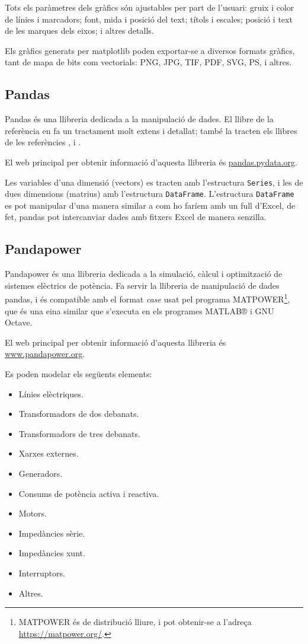Tots els paràmetres dels gràfics són ajustables per part de l'usuari: gruix i color de línies i marcadors; font, mida i posició  del text;  títols i escales; posició i text de les marques dels eixos; i altres detalls.

Els gràfics generats per matplotlib poden exportar-se a diversos formats gràfics, tant de mapa de bits com vectorials: PNG, JPG, TIF, PDF, SVG, PS, i altres.



\subsection{Pandas}

Pandas és una llibreria dedicada a la manipulació de dades.  El llibre de la referència \cite{VAN} en fa un tractament molt extens i detallat; també la tracten els llibres de les referències \cite{JOH}, \cite{HIL} i \cite{ZUM}.


El  web principal per obtenir informació d'aquesta llibreria és \href{https://pandas.pydata.org/}{pandas.pydata.org}.

Les variables d'una dimensió (vectors) es tracten amb l'estructura \texttt{Series}, i les de dues dimensions (matrius) amb l'estructura \texttt{DataFrame}. L'estructura \texttt{DataFrame} es pot manipular d'una manera similar a com ho faríem amb un full d'Excel, de fet, pandas pot intercanviar dades amb fitxers Excel de manera senzilla.


\subsection{Pandapower}

Pandapower és una llibreria dedicada a la simulació, càlcul i optimització de sistemes elèctrics de potència.  Fa servir la llibreria de manipulació de dades pandas, i és compatible amb el format \textit{case} usat pel programa MATPOWER\footnote{MATPOWER és de distribució lliure, i pot obtenir-se a l'adreça \href{https://matpower.org/}{https://matpower.org/}.}, que és una eina similar que s'executa en els programes MATLAB® i GNU Octave.

El  web principal per obtenir informació d'aquesta llibreria és \href{https://www.pandapower.org/}{www.pandapower.org}.

Es poden modelar els següents elements:
\begin{itemize}
	\item Línies elèctriques.
	\item Transformadors de dos debanats.
	\item Transformadors de tres debanats.
	\item Xarxes externes.
	\item Generadors.
	\item Consums de potència activa i reactiva.
	\item Motors.
	\item Impedàncies sèrie.
	\item Impedàncies xunt.
	\item Interruptors.
	\item Altres.
\end{itemize}

